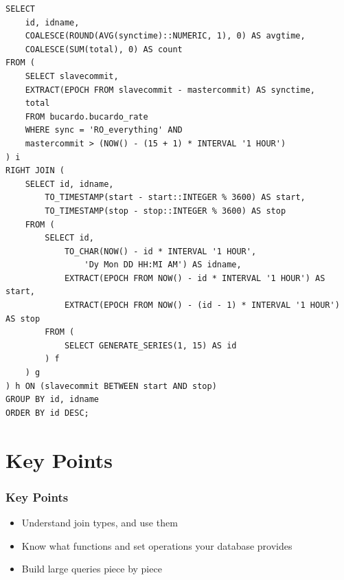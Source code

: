 \documentclass{beamer}
\begin{document}
\begin{frame}[fragile]
    \tiny
    \begin{verbatim}
SELECT
    id, idname,
    COALESCE(ROUND(AVG(synctime)::NUMERIC, 1), 0) AS avgtime,
    COALESCE(SUM(total), 0) AS count
FROM (
    SELECT slavecommit,
    EXTRACT(EPOCH FROM slavecommit - mastercommit) AS synctime,
    total
    FROM bucardo.bucardo_rate
    WHERE sync = 'RO_everything' AND
    mastercommit > (NOW() - (15 + 1) * INTERVAL '1 HOUR')
) i
RIGHT JOIN (
    SELECT id, idname,
        TO_TIMESTAMP(start - start::INTEGER % 3600) AS start,
        TO_TIMESTAMP(stop - stop::INTEGER % 3600) AS stop
    FROM (
        SELECT id,
            TO_CHAR(NOW() - id * INTERVAL '1 HOUR', 
                'Dy Mon DD HH:MI AM') AS idname,
            EXTRACT(EPOCH FROM NOW() - id * INTERVAL '1 HOUR') AS start,
            EXTRACT(EPOCH FROM NOW() - (id - 1) * INTERVAL '1 HOUR') AS stop
        FROM (
            SELECT GENERATE_SERIES(1, 15) AS id
        ) f
    ) g
) h ON (slavecommit BETWEEN start AND stop)
GROUP BY id, idname
ORDER BY id DESC;
    \end{verbatim}
\end{frame}

\section{Key Points}
\begin{frame}
    \frametitle{Key Points}
    \begin{itemize}
        \item Understand join types, and use them
        \item Know what functions and set operations your database provides
        \item Build large queries piece by piece
    \end{itemize}
\end{frame}

\end{document}
